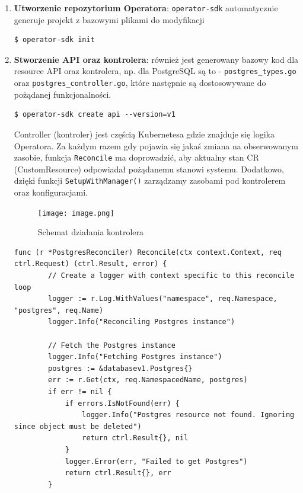 \documentclass[polish]{aghengthesis}
\begin{document}
\begin{enumerate}
    \item \textbf{Utworzenie repozytorium Operatora}: \verb|operator-sdk| automatycznie generuje projekt z bazowymi plikami do modyfikacji
    \begin{lstlisting}[basicstyle=\ttfamily, numbers=none]
$ operator-sdk init\end{lstlisting}\vspace{-30pt}
   \item \textbf{Stworzenie API oraz kontrolera}:
   również jest generowany bazowy kod dla resource API oraz kontrolera, np. dla PostgreSQL są to - \verb|postgres_types.go| oraz \verb|postgres_controller.go|, które następnie są dostosowywane do pożądanej funkcjonalności.
   \begin{lstlisting}[basicstyle=\ttfamily, numbers=none]
$ operator-sdk create api --version=v1 \end{lstlisting}\vspace{-30pt}
    
   Controller (kontroler) jest częścią Kubernetesa gdzie znajduje się logika Operatora. Za każdym razem gdy pojawia się jakaś zmiana na obserwowanym zasobie, funkcja \verb|Reconcile| ma doprowadzić, aby aktualny stan CR (CustomResource) odpowiadał pożądanemu stanowi systemu. Dodatkowo, dzięki funkcji \verb|SetupWithManager()| zarządzamy zasobami pod kontrolerem oraz konfiguracjami.

    \begin{figure}[H]
        \centering
        \texttt{[image: image.png]}
        \caption{Schemat działania kontrolera\cite{hausenblas2019programming}}
        \label{fig:controler}
    \end{figure}
   
    \begin{lstlisting}[caption=fragment kontrolera dla PostgreSQL]
    func (r *PostgresReconciler) Reconcile(ctx context.Context, req ctrl.Request) (ctrl.Result, error) {
    	// Create a logger with context specific to this reconcile loop
    	logger := r.Log.WithValues("namespace", req.Namespace, "postgres", req.Name)
    	logger.Info("Reconciling Postgres instance")
    
    	// Fetch the Postgres instance
    	logger.Info("Fetching Postgres instance")
    	postgres := &databasev1.Postgres{}
    	err := r.Get(ctx, req.NamespacedName, postgres)
    	if err != nil {
    		if errors.IsNotFound(err) {
    			logger.Info("Postgres resource not found. Ignoring since object must be deleted")
    			return ctrl.Result{}, nil
    		}
    		logger.Error(err, "Failed to get Postgres")
    		return ctrl.Result{}, err
    	}
    

\end{lstlisting}
\end{enumerate}
\end{document}
